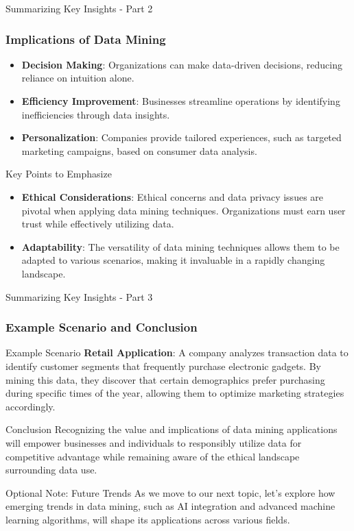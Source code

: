 \documentclass[aspectratio=169]{beamer}
\begin{document}
\begin{frame}[fragile]{Summarizing Key Insights - Part 2}
    \frametitle{Implications of Data Mining}
    
    \begin{itemize}
        \item \textbf{Decision Making}: Organizations can make data-driven decisions, reducing reliance on intuition alone.
        \item \textbf{Efficiency Improvement}: Businesses streamline operations by identifying inefficiencies through data insights.
        \item \textbf{Personalization}: Companies provide tailored experiences, such as targeted marketing campaigns, based on consumer data analysis.
    \end{itemize}

    \begin{block}{Key Points to Emphasize}
        \begin{itemize}
            \item \textbf{Ethical Considerations}: Ethical concerns and data privacy issues are pivotal when applying data mining techniques. Organizations must earn user trust while effectively utilizing data.
            \item \textbf{Adaptability}: The versatility of data mining techniques allows them to be adapted to various scenarios, making it invaluable in a rapidly changing landscape.
        \end{itemize}
    \end{block}
\end{frame}

\begin{frame}[fragile]{Summarizing Key Insights - Part 3}
    \frametitle{Example Scenario and Conclusion}

    \begin{block}{Example Scenario}
        \textbf{Retail Application}: A company analyzes transaction data to identify customer segments that frequently purchase electronic gadgets. By mining this data, they discover that certain demographics prefer purchasing during specific times of the year, allowing them to optimize marketing strategies accordingly.
    \end{block}

    \begin{block}{Conclusion}
        Recognizing the value and implications of data mining applications will empower businesses and individuals to responsibly utilize data for competitive advantage while remaining aware of the ethical landscape surrounding data use.
    \end{block}

    \begin{block}{Optional Note: Future Trends}
        As we move to our next topic, let's explore how emerging trends in data mining, such as AI integration and advanced machine learning algorithms, will shape its applications across various fields.
    \end{block}

\end{frame}
\end{document}
